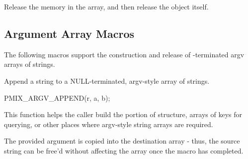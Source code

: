\begin{arglist}
\end{arglist}



Release the memory in the array, and then release the  object itself.


\begin{arglist}
\end{arglist}


\subsection{Argument Array Macros}

The following macros support the construction and release of -terminated argv arrays of strings.


Append a string to a NULL-terminated, argv-style array of strings.

\cspecificstart
\begin{codepar}
PMIX_ARGV_APPEND(r, a, b);
\end{codepar}
\cspecificend

\begin{arglist}
\end{arglist}

This function helps the caller build the  portion of  structure, arrays of keys for querying, or other places where argv-style string arrays are required.

\adviceuserstart
The provided argument is copied into the destination array - thus, the source string can be free'd without affecting the array once the macro has completed.
\adviceuserend

